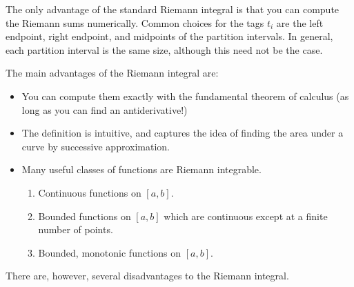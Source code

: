 \documentclass[12pt]{amsart}         %
\theoremstyle{remark}
\begin{document}
The only advantage of the standard Riemann integral is that you can compute the Riemann sums numerically. Common choices for the tags $t_i$ are the left endpoint, right endpoint, and midpoints of the partition intervals. In general, each partition interval is the same size, although this need not be the case.

The main advantages of the Riemann integral are:
\begin{itemize}
    \item You can compute them exactly with the fundamental theorem of calculus (as long as you can find an antiderivative!)
    \item The definition is intuitive, and captures the idea of finding the area under a curve by successive approximation.
    \item Many useful classes of functions are Riemann integrable.
    \begin{enumerate}
        \item Continuous functions on $[a, b]$.
        \item Bounded functions on $[a, b]$ which are continuous except at a finite number of points.
        \item Bounded, monotonic functions on $[a,b]$.
    \end{enumerate}
\end{itemize}

There are, however, several disadvantages to the Riemann integral.
\end{document}
